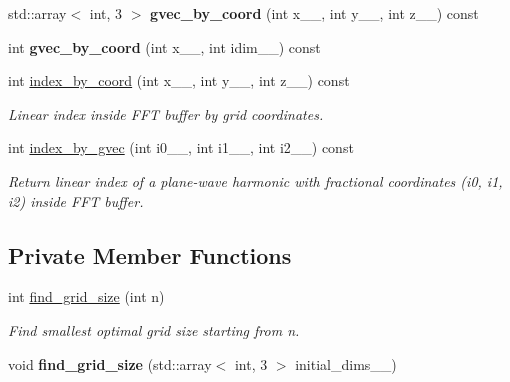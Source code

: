 \begin{DoxyCompactItemize}
\item 
\hypertarget{classsddk_1_1_f_f_t3_d__grid_ad056a54852483308d0045ac1fdd2363f}{}std\+::array$<$ int, 3 $>$ {\bfseries gvec\+\_\+by\+\_\+coord} (int x\+\_\+\+\_\+, int y\+\_\+\+\_\+, int z\+\_\+\+\_\+) const \label{classsddk_1_1_f_f_t3_d__grid_ad056a54852483308d0045ac1fdd2363f}

\item 
\hypertarget{classsddk_1_1_f_f_t3_d__grid_a4ac2cedb46e0b09dd49b42a493bb4041}{}int {\bfseries gvec\+\_\+by\+\_\+coord} (int x\+\_\+\+\_\+, int idim\+\_\+\+\_\+) const \label{classsddk_1_1_f_f_t3_d__grid_a4ac2cedb46e0b09dd49b42a493bb4041}

\item 
int \hyperlink{classsddk_1_1_f_f_t3_d__grid_a3ef57611bec87b32f2705b3f6926adf3}{index\+\_\+by\+\_\+coord} (int x\+\_\+\+\_\+, int y\+\_\+\+\_\+, int z\+\_\+\+\_\+) const 
\begin{DoxyCompactList}\small\item\em Linear index inside F\+F\+T buffer by grid coordinates. \end{DoxyCompactList}\item 
int \hyperlink{classsddk_1_1_f_f_t3_d__grid_a507fc482f1aa4a71b1d95b7f5fdfc769}{index\+\_\+by\+\_\+gvec} (int i0\+\_\+\+\_\+, int i1\+\_\+\+\_\+, int i2\+\_\+\+\_\+) const 
\begin{DoxyCompactList}\small\item\em Return linear index of a plane-\/wave harmonic with fractional coordinates (i0, i1, i2) inside F\+F\+T buffer. \end{DoxyCompactList}\end{DoxyCompactItemize}
\subsection*{Private Member Functions}
\begin{DoxyCompactItemize}
\item 
int \hyperlink{classsddk_1_1_f_f_t3_d__grid_ace2e6d322b46c111839602d52ab6d371}{find\+\_\+grid\+\_\+size} (int n)
\begin{DoxyCompactList}\small\item\em Find smallest optimal grid size starting from n. \end{DoxyCompactList}\item 
\hypertarget{classsddk_1_1_f_f_t3_d__grid_a0591d5c0a6cf98c8515fa545555f72db}{}void {\bfseries find\+\_\+grid\+\_\+size} (std\+::array$<$ int, 3 $>$ initial\+\_\+dims\+\_\+\+\_\+)\label{classsddk_1_1_f_f_t3_d__grid_a0591d5c0a6cf98c8515fa545555f72db}

\end{DoxyCompactItemize}
